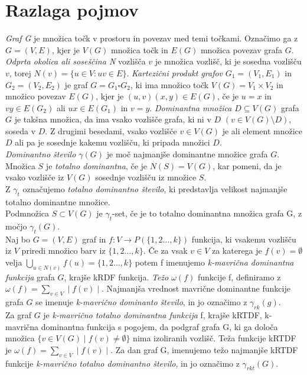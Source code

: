 \documentclass[12pt,a4paper]{amsart}
\begin{document}
\section{Razlaga pojmov}

\textit{Graf G} je množica točk v prostoru in povezav med temi točkami. Označimo ga z $G=(V, E)$, kjer je $V(G)$ množica točk in $E(G)$ množica povezav grafa $G$.
\textit{Odprta okolica ali soseščina N} vozlišča $v$ je množica vozlišč, ki je sosedna vozlišču $v$, torej $N(v) =\{ u\in V: uv\in E \}$. \textit{Kartezični produkt grafov} $G_1 = (V_1, E_1)$ in $G_2 = (V_2, E_2)$ je graf $G = G_1 \square G_2$, ki ima množico točk $ V(G) = V_1 \times V_2$ in množico povezav $ E(G)$, kjer je $(u,v)(x,y) \in E(G)$, če je $ u=x $ in $vy \in E(G_2) $ ali $ux \in E(G_1)$ in $v = y$.
\textit{Dominantna množica $ D \subseteq V(G) $} grafa $G$ je takšna množica, da ima vsako vozlišče grafa, ki ni v $D$ $( v \in V(G) \setminus D)$, soseda v $D$. Z drugimi besedami, vsako vozlišče  $v \in V(G)$ je ali  element množice $D$ ali pa je sosednje kakemu vozlišču, ki pripada množici $D$.  \\ \textit{ Dominantno število $\gamma(G) $} je moč najmanjše dominantne množice grafa $G$. \\
Množica $S$ je \textit{totalno dominantna}, če je $ N(S) = V(G)$, kar pomeni, da je vsako vozlišče iz $ V(G)$ sosednje vozlišču iz množice $S$. \\
 Z \textit{$ \gamma_t $ }označujemo \textit{totalno dominantno število}, ki predstavlja velikost najmanjše totalno dominantne množice. \\
 Podmnožica $S \subset V(G)$ je $\gamma_t$-set, če je to totalno dominantna množica grafa G, z močjo $\gamma_t(G)$.\\
Naj bo $G=(V, E)$ graf in $f: V \to P (\{1,2\dots,k\})$ funkcija, ki vsakemu vozlišču iz $V$ priredi množico barv iz $ \{1,2\dots,k\}$. Če za vsak $v \in V$ za katerega je $ f(v) = \emptyset $ velja $ \bigcup_{u \in N(v) } f(u) = \{1,2\dots,k\}$ potem f imenujemo\textit{  k-mavrična dominantna funkcija } grafa $G$, krajše kRDF funkcija. \textit{Težo $\omega(f)$} funkcije f, definiramo z $\omega(f) = \sum_{v \in V} \mid f(v)\mid$. Najmanjša vrednost mavrične dominantne funkcije grafa $G$ se imenuje \textit{k-mavrično dominanto število}, in jo označimo z $\gamma_{rk} (g)$.\\
Za graf $G$ je \textit{k-mavrično totalno dominantna funkcija} f, krajše kRTDF,  k-mavrična dominantna funkcija s pogojem, da podgraf grafa G, ki ga določa množica $\{v \in V(G) \mid f(v) \neq \emptyset \}$ nima izoliranih vozlišč. Teža funkcije kRTDF je  $\omega(f) = \sum_{v \in V} \mid f(v)\mid$. Za dan graf G, imenujemo težo najmanjše kRTDF funkcije \textit{k-mavrično totalno dominantno število}, in jo označimo z  $\gamma_{rkt} (G)$.
\end{document}
